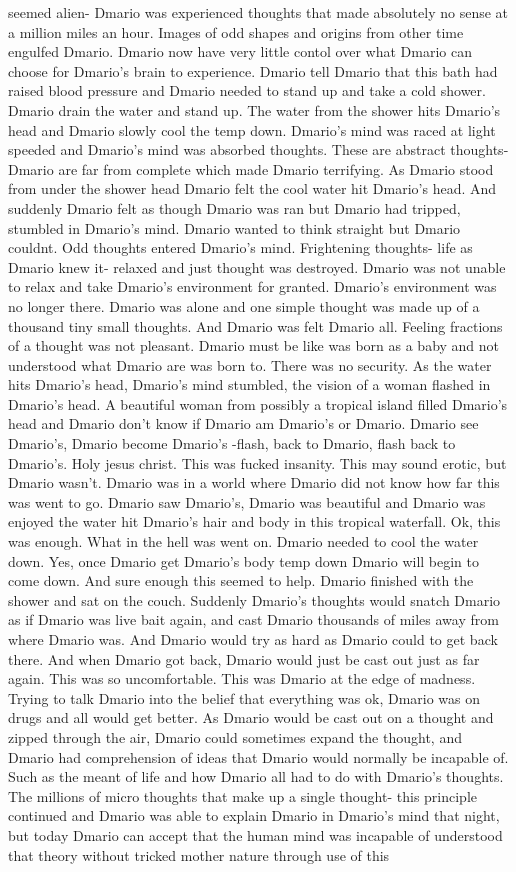 \documentclass[12pt]{book}
\begin{document}
seemed alien- Dmario was experienced thoughts that made absolutely no sense at a million miles an hour. Images of odd shapes and origins from other time engulfed Dmario. Dmario now have very little contol over what Dmario can choose for Dmario's brain to experience. Dmario tell Dmario that this bath had raised blood pressure and Dmario needed to stand up and take a cold shower. Dmario drain the water and stand up. The water from the shower hits Dmario's head and Dmario slowly cool the temp down. Dmario's mind was raced at light speeded and Dmario's mind was absorbed thoughts. These are abstract thoughts- Dmario are far from complete which made Dmario terrifying. As Dmario stood from under the shower head Dmario felt the cool water hit Dmario's head. And suddenly Dmario felt as though Dmario was ran but Dmario had tripped, stumbled in Dmario's mind. Dmario wanted to think straight but Dmario couldnt. Odd thoughts entered Dmario's mind. Frightening thoughts- life as Dmario knew it- relaxed and just thought was destroyed. Dmario was not unable to relax and take Dmario's environment for granted. Dmario's environment was no longer there. Dmario was alone and one simple thought was made up of a thousand tiny small thoughts. And Dmario was felt Dmario all. Feeling fractions of a thought was not pleasant. Dmario must be like was born as a baby and not understood what Dmario are was born to. There was no security. As the water hits Dmario's head, Dmario's mind stumbled, the vision of a woman flashed in Dmario's head. A beautiful woman from possibly a tropical island filled Dmario's head and Dmario don't know if Dmario am Dmario's or Dmario. Dmario see Dmario's, Dmario become Dmario's -flash, back to Dmario, flash back to Dmario's. Holy jesus christ. This was fucked insanity. This may sound erotic, but Dmario wasn't. Dmario was in a world where Dmario did not know how far this was went to go. Dmario saw Dmario's, Dmario was beautiful and Dmario was enjoyed the water hit Dmario's hair and body in this tropical waterfall. Ok, this was enough. What in the hell was went on. Dmario needed to cool the water down. Yes, once Dmario get Dmario's body temp down Dmario will begin to come down. And sure enough this seemed to help. Dmario finished with the shower and sat on the couch. Suddenly Dmario's thoughts would snatch Dmario as if Dmario was live bait again, and cast Dmario thousands of miles away from where Dmario was. And Dmario would try as hard as Dmario could to get back there. And when Dmario got back, Dmario would just be cast out just as far again. This was so uncomfortable. This was Dmario at the edge of madness. Trying to talk Dmario into the belief that everything was ok, Dmario was on drugs and all would get better. As Dmario would be cast out on a thought and zipped through the air, Dmario could sometimes expand the thought, and Dmario had comprehension of ideas that Dmario would normally be incapable of. Such as the meant of life and how Dmario all had to do with Dmario's thoughts. The millions of micro thoughts that make up a single thought- this principle continued and Dmario was able to explain Dmario in Dmario's mind that night, but today Dmario can accept that the human mind was incapable of understood that theory without tricked mother nature through use of this 
\end{document}
